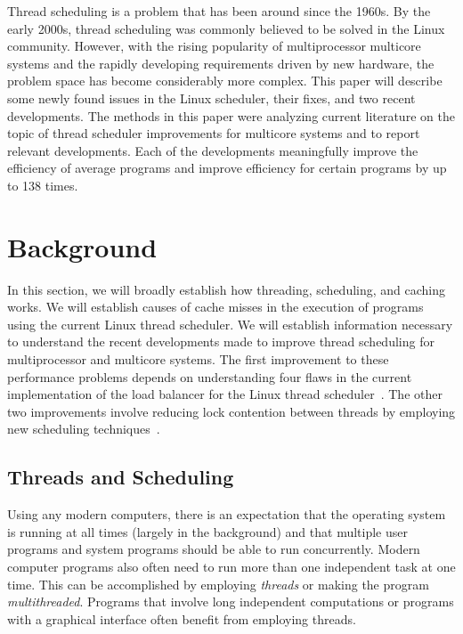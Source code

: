 \documentclass{sig-alternate}
\begin{document}
Thread scheduling is a problem that has been around since the 1960s. By the early 2000s, thread scheduling was commonly believed to be solved in the Linux community. However, with the rising popularity of multiprocessor multicore systems and the rapidly developing requirements driven by new hardware, the problem space has become considerably more complex. This paper will describe some newly found issues in the Linux scheduler, their fixes, and two recent developments. The methods in this paper were analyzing current literature on the topic of thread scheduler improvements for multicore systems and to report relevant developments. Each of the developments meaningfully improve the efficiency of average programs and improve efficiency for certain programs by up to 138 times.~\cite{Lozi:2016}

\section{Background}
\label{sec:bg}

In this section, we will broadly establish how threading, scheduling, and caching works. We will establish causes of cache misses in the execution of programs using the current Linux thread scheduler. We will establish information necessary to understand the recent developments made to improve thread scheduling for multiprocessor and multicore systems. The first improvement to these performance problems depends on understanding four flaws in the current implementation of the load balancer for the Linux thread scheduler~\cite{Lozi:2016}. The other two improvements involve reducing lock contention between threads by employing new scheduling techniques~\cite{JoEtal:2017,KumarEtal:2014}.

\subsection{Threads and Scheduling}
\label{sec:threads}
Using any modern computers, there is an expectation that the operating system is running at all times (largely in the background) and that multiple user programs and system programs should be able to run concurrently. Modern computer programs also often need to run more than one independent task at one time. This can be accomplished by employing \emph{threads} or  making the program \emph{multithreaded}. Programs that involve long independent computations or programs with a graphical interface often benefit from employing threads.
\end{document}
